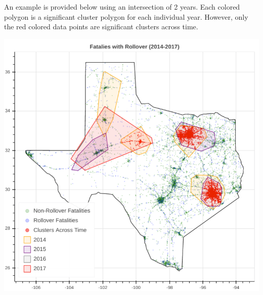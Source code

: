 \documentclass{article}
\begin{document}
An example is provided below using an intersection of 2 years. Each colored polygon is a significant cluster polygon for each individual year. However, only the red colored data points are significant clusters across time.
\begin{center}
\includegraphics[scale=0.4]{technical.png}
\end{center}
\end{document}
